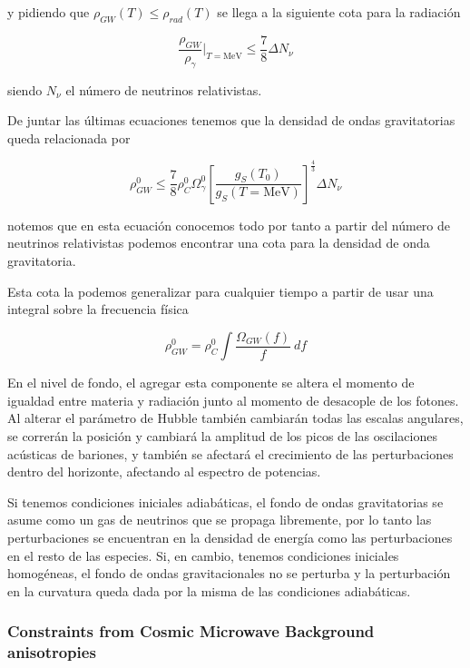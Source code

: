 \noindent
y pidiendo que $\rho_{GW} (T) \leq \rho_{rad} (T)$ se llega a la siguiente cota para la radiación

\begin{equation}
    \frac{\rho_{GW}}{\rho_\gamma} \bigg|_{T = \text{MeV}} \leq \frac{7}{8} \Delta N_\nu
\end{equation}

\noindent
siendo $N_\nu$ el número de neutrinos relativistas.

De juntar las últimas ecuaciones tenemos que la densidad de ondas gravitatorias queda relacionada por

\begin{equation}
    \rho_{GW}^0 \leq \frac{7}{8} \rho_C^{0} \Omega_{\gamma}^0 \left[\frac{g_S (T_0)}{g_S (T = \text{MeV})} \right]^{\displaystyle \frac{4}{3}} \Delta N_\nu 
\end{equation}

\noindent
notemos que en esta ecuación conocemos todo por tanto a partir del número de neutrinos relativistas podemos encontrar una cota para la densidad de onda gravitatoria.

Esta cota la podemos generalizar para cualquier tiempo a partir de usar una integral sobre la frecuencia física

\begin{equation}
    \rho_{GW}^0 = \rho_{C}^0 \int \frac{\Omega_{GW} (f)}{f} \ df
\end{equation}

En el nivel de fondo, el agregar esta componente se altera el momento de igualdad entre materia y radiación junto al momento de desacople de los fotones. Al alterar el parámetro de Hubble también cambiarán todas las escalas angulares, se correrán la posición y cambiará la amplitud de los picos de las oscilaciones acústicas de bariones, y también se afectará el crecimiento de las perturbaciones dentro del horizonte, afectando al espectro de potencias.

Si tenemos condiciones iniciales adiabáticas, el fondo de ondas gravitatorias se asume como un gas de neutrinos que se propaga libremente, por lo tanto las perturbaciones se encuentran en la densidad de energía como las perturbaciones en el resto de las especies. Si, en cambio, tenemos condiciones iniciales homogéneas, el fondo de ondas gravitacionales no se perturba y la perturbación en la curvatura queda dada por la misma de las condiciones adiabáticas.

\subsubsection{Constraints from Cosmic Microwave Background anisotropies}

